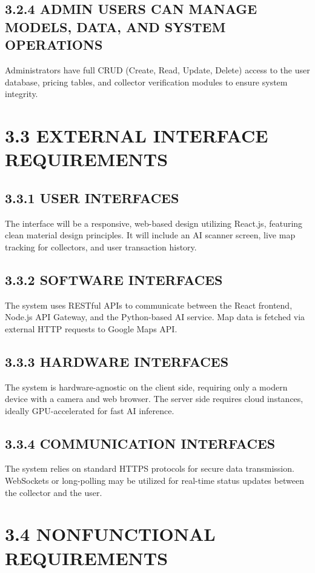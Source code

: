 \subsection{3.2.4 ADMIN USERS CAN MANAGE MODELS, DATA, AND SYSTEM OPERATIONS}
Administrators have full CRUD (Create, Read, Update, Delete) access to the user database, pricing tables, and collector verification modules to ensure system integrity.

\section{3.3 EXTERNAL INTERFACE REQUIREMENTS}

\subsection{3.3.1 USER INTERFACES}
The interface will be a responsive, web-based design utilizing React.js, featuring clean material design principles. It will include an AI scanner screen, live map tracking for collectors, and user transaction history.

\subsection{3.3.2 SOFTWARE INTERFACES}
The system uses RESTful APIs to communicate between the React frontend, Node.js API Gateway, and the Python-based AI service. Map data is fetched via external HTTP requests to Google Maps API.

\subsection{3.3.3 HARDWARE INTERFACES}
The system is hardware-agnostic on the client side, requiring only a modern device with a camera and web browser. The server side requires cloud instances, ideally GPU-accelerated for fast AI inference.

\subsection{3.3.4 COMMUNICATION INTERFACES}
The system relies on standard HTTPS protocols for secure data transmission. WebSockets or long-polling may be utilized for real-time status updates between the collector and the user.

\section{3.4 NONFUNCTIONAL REQUIREMENTS}

